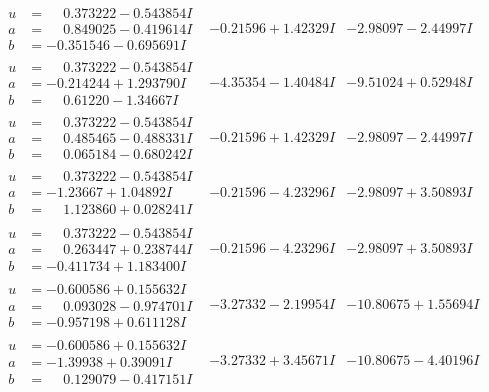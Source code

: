 \documentclass[1p]{elsarticle_modified}
\theoremstyle{definition}
\begin{document}
$$\begin{array}{c|c|c}
\begin{aligned}
u &= \phantom{-}0.373222 - 0.543854 I \\
a &= \phantom{-}0.849025 - 0.419614 I \\
b &= -0.351546 - 0.695691 I\end{aligned}
 & -0.21596 + 1.42329 I & -2.98097 - 2.44997 I \\ \hline\begin{aligned}
u &= \phantom{-}0.373222 - 0.543854 I \\
a &= -0.214244 + 1.293790 I \\
b &= \phantom{-}0.61220 - 1.34667 I\end{aligned}
 & -4.35354 - 1.40484 I & -9.51024 + 0.52948 I \\ \hline\begin{aligned}
u &= \phantom{-}0.373222 - 0.543854 I \\
a &= \phantom{-}0.485465 - 0.488331 I \\
b &= \phantom{-}0.065184 - 0.680242 I\end{aligned}
 & -0.21596 + 1.42329 I & -2.98097 - 2.44997 I \\ \hline\begin{aligned}
u &= \phantom{-}0.373222 - 0.543854 I \\
a &= -1.23667 + 1.04892 I \\
b &= \phantom{-}1.123860 + 0.028241 I\end{aligned}
 & -0.21596 - 4.23296 I & -2.98097 + 3.50893 I \\ \hline\begin{aligned}
u &= \phantom{-}0.373222 - 0.543854 I \\
a &= \phantom{-}0.263447 + 0.238744 I \\
b &= -0.411734 + 1.183400 I\end{aligned}
 & -0.21596 - 4.23296 I & -2.98097 + 3.50893 I \\ \hline\begin{aligned}
u &= -0.600586 + 0.155632 I \\
a &= \phantom{-}0.093028 - 0.974701 I \\
b &= -0.957198 + 0.611128 I\end{aligned}
 & -3.27332 - 2.19954 I & -10.80675 + 1.55694 I \\ \hline\begin{aligned}
u &= -0.600586 + 0.155632 I \\
a &= -1.39938 + 0.39091 I \\
b &= \phantom{-}0.129079 - 0.417151 I\end{aligned}
 & -3.27332 + 3.45671 I & -10.80675 - 4.40196 I \\ \hline\begin{aligned}

\end{aligned}
\end{array}$$
\end{document}
